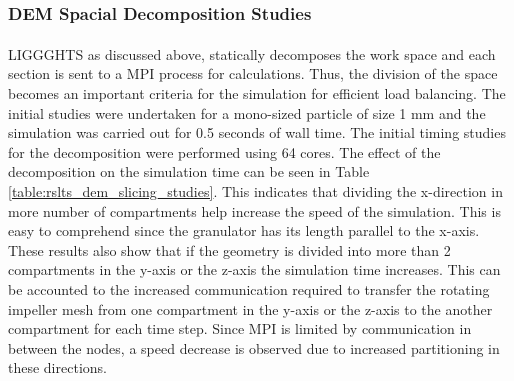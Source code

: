 \documentclass[preprint,11pt,authoryear]{elsarticle}
\begin{document}
	    \subsubsection{DEM Spacial Decomposition Studies}
	    \par LIGGGHTS\textsuperscript{\textregistered} as discussed above, statically decomposes the work space and each section is sent to a MPI process for calculations. Thus, the division of the space becomes an important criteria for the simulation for efficient load balancing. The initial studies were undertaken for a mono-sized particle of size 1 mm and the simulation was carried out for 0.5 seconds of wall time. The initial timing studies for the decomposition were performed using 64 cores. The effect of the decomposition on the simulation time can be seen in Table \ref{table:rslts_dem_slicing_studies}. This indicates that dividing the x-direction in more number of compartments help increase the speed of the simulation. This is easy to comprehend since the granulator has its length parallel to the x-axis. These results also show that if the geometry is divided into more than 2 compartments in the y-axis or the z-axis the simulation time increases. This can be accounted to the increased communication required to transfer the rotating impeller mesh from one compartment in the y-axis or the z-axis to the another compartment for each time step. Since MPI is limited by communication in between the nodes, a speed decrease is observed due to increased partitioning in these directions.
	    
	      \begin{table}[ht]
	      \caption{The effect of spatial decomposition on the performance of the DEM simulations}
		  \label{table:rslts_dem_slicing_studies}
		  \begin{center}

\end{center}		  	      
	      \end{table}
	      
\end{document}
